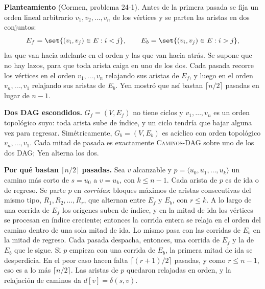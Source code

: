 \documentclass[11pt,letterpaper]{article}
\begin{document}
\textbf{Planteamiento} (Cormen, problema 24-1). Antes de la primera
pasada se fija un orden lineal arbitrario $v_1, v_2, \dots, v_n$ de
los vértices y se parten las aristas en dos conjuntos:
\[
  E_f = \set{(v_i, v_j) \in E : i < j} , \qquad
  E_b = \set{(v_i, v_j) \in E : i > j} ,
\]
las que van hacia adelante en el orden y las que van hacia atrás. Se
supone que no hay lazos, para que toda arista caiga en uno de los dos.
Cada pasada recorre los vértices en el orden $v_1, \dots, v_n$
relajando sus aristas de $E_f$, y luego en el orden
$v_n, \dots, v_1$ relajando sus aristas de $E_b$. Yen mostró que así
bastan $\lceil n/2 \rceil$ pasadas en lugar de $n - 1$.

\textbf{Dos DAG escondidos.} $G_f = (V, E_f)$ no tiene ciclos y
$v_1, \dots, v_n$ es un orden topológico suyo: toda arista sube de
índice, y un ciclo tendría que bajar alguna vez para regresar.
Simétricamente, $G_b = (V, E_b)$ es acíclico con orden topológico
$v_n, \dots, v_1$. Cada mitad de pasada es exactamente
\textsc{Caminos-DAG} sobre uno de los dos DAG; Yen alterna los dos.

\textbf{Por qué bastan $\lceil n/2 \rceil$ pasadas.} Sea $v$
alcanzable y $p = \langle u_0, u_1, \dots, u_k \rangle$ un camino más
corto de $s = u_0$ a $v = u_k$, con $k \le n - 1$. Cada arista de $p$
es de ida o de regreso. Se parte $p$ en \emph{corridas}: bloques
máximos de aristas consecutivas del mismo tipo,
$R_1, R_2, \dots, R_r$, que alternan entre $E_f$ y $E_b$, con
$r \le k$. A lo largo de una corrida de $E_f$ los orígenes suben de
índice, y en la mitad de ida los vértices se procesan en índice
creciente; entonces la corrida entera se relaja en el orden del camino
dentro de una sola mitad de ida. Lo mismo pasa con las corridas de
$E_b$ en la mitad de regreso. Cada pasada despacha, entonces, una
corrida de $E_f$ y la de $E_b$ que le sigue. Si $p$ empieza con una
corrida de $E_b$, la primera mitad de ida se desperdicia. En el peor
caso hacen falta $\lceil (r + 1)/2 \rceil$ pasadas, y como
$r \le n - 1$, eso es a lo más $\lceil n/2 \rceil$. Las aristas de
$p$ quedaron relajadas en orden, y la relajación de caminos da
$d[v] = \delta(s, v)$.
\end{document}
